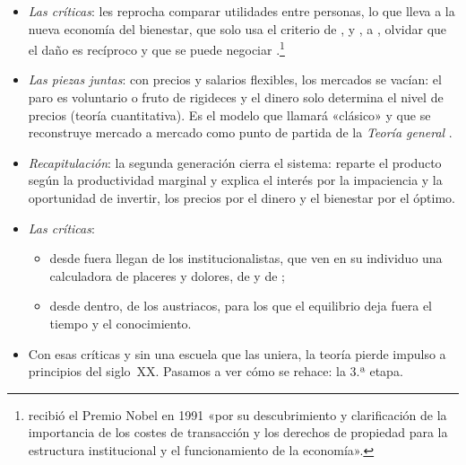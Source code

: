 \documentclass[11pt]{article}
\begin{document}
\begin{itemize}
\begin{itemize}
  \item cuando el producto neto marginal privado se separa del social, el mercado no lleva al óptimo: es la . Con un coste marginal externo, $\mathrm{CMgS}=\mathrm{CMgP}+\mathrm{CMgE}$, el mercado produce de más, y un impuesto por unidad igual al daño marginal en el óptimo, $t^*=\mathrm{CMgE}(q^*)$, el , lo corrige . Es la lógica de los impuestos medioambientales y del precio del carbono  .
  \end{itemize}
\item \emph{Las críticas}: \textcite{Robbins1932Essay} les reprocha comparar utilidades entre personas, lo que lleva a la nueva economía del bienestar, que solo usa el criterio de  , y \textcite{Coase1960Problem}, a , olvidar que el daño es recíproco y que se puede negociar .\footnote{ recibió el Premio Nobel en 1991 «por su descubrimiento y clarificación de la importancia de los costes de transacción y los derechos de propiedad para la estructura institucional y el funcionamiento de la economía»\nocite{Nobel1991Coase}.}
\end{itemize}

\begin{itemize}
\item \emph{Las piezas juntas}: con precios y salarios flexibles, los mercados se vacían: el paro es voluntario o fruto de rigideces y el dinero solo determina el nivel de precios (teoría cuantitativa). Es el modelo que  llamará «clásico» y que se reconstruye mercado a mercado como punto de partida de la \emph{Teoría general}\nocite{Heijdra2017Foundations} .
\item \emph{Recapitulación}: la segunda generación cierra el sistema: reparte el producto según la productividad marginal y explica el interés por la impaciencia y la oportunidad de invertir, los precios por el dinero y el bienestar por el óptimo.
\item \emph{Las críticas}:
  \begin{itemize}
  \item desde fuera llegan de los institucionalistas, que ven en su individuo una calculadora de placeres y dolores\nocite{Veblen1898Why}, de \textcite{Sraffa1926Laws} y de \textcite{Keynes1936};
  \item desde dentro, de los austriacos, para los que el equilibrio deja fuera el tiempo y el conocimiento.
  \end{itemize}
\item Con esas críticas y sin una escuela que las uniera, la teoría pierde impulso a principios del siglo~XX. Pasamos a ver cómo se rehace: la 3.ª etapa.
\end{itemize}
\end{document}
